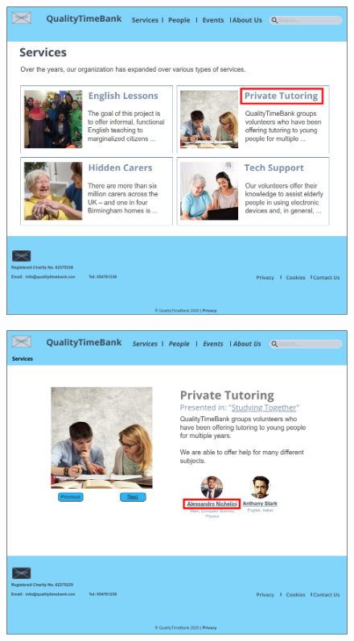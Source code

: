 \documentclass[a4paper, 11pt, parskip=half, headsepline]{scrreprt}
\begin{document}
\begin{figure}[H]
	\centering
	\includegraphics[width=1\linewidth, keepaspectratio]{scenarios/scenario-12}
	\caption{}
	\label{fig:scenario-12}
\end{figure}

\begin{figure}[H]
	\centering
	\includegraphics[width=1\linewidth, keepaspectratio]{scenarios/scenario-13}
	\caption{}
	\label{fig:scenario-13}
\end{figure}
\end{document}

